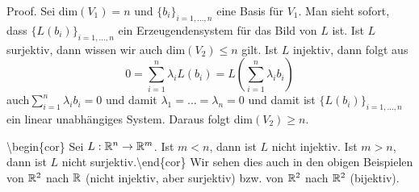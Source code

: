 \begin{emphBox}{}{}
Proof.  Sei dim\((V_1)=n\) und \(\{b_i\}_{i=1,\ldots,n}\) eine Basis für \(V_1\). Man sieht sofort, dass \(\{L(b_i)\}_{i=1,\ldots,n}\) ein Erzeugendensystem für das Bild von \(L\) ist. Ist \(L\) surjektiv, dann wissen wir auch dim\((V_2) \leq n\) gilt. Ist \(L\) injektiv, dann folgt aus
\begin{equation*}
 0 = \sum_{i=1}^n \lambda_i L(b_i) = L( \sum_{i=1}^n \lambda_i b_i)
\end{equation*}
auch\(\sum_{i=1}^n \lambda_i b_i = 0\) und damit \(\lambda_1=\ldots=\lambda_n = 0\) und damit ist \(\{L(b_i)\}_{i=1,\ldots,n}\) ein linear unabhängiges System. Daraus folgt dim\((V_2) \geq n\).
\end{emphBox}

\textbackslash{}begin\{cor\}
Sei \(L: \mathbb{R}^n \rightarrow \mathbb{R}^m\). Ist \(m < n\), dann ist \(L\) nicht injektiv. Ist \(m> n\), dann ist \(L\) nicht surjektiv.\textbackslash{}end\{cor\}
Wir sehen dies auch in den obigen Beispielen von \(\mathbb{R}^2\) nach  \(\mathbb{R}\) (nicht injektiv, aber surjektiv) bzw. von \(\mathbb{R}^2\) nach \(\mathbb{R}^2\) (bijektiv).

